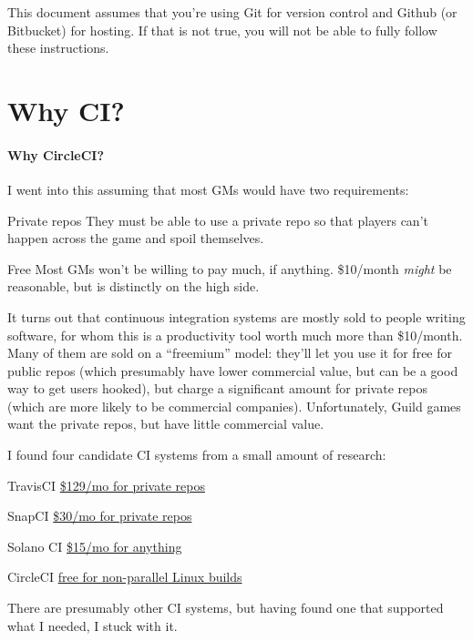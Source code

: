 \documentclass[green]{testgame}
\begin{document}
\newcommand{\ter}[1]{\fbox{\parbox{6.5in}{{\tt #1}}}}


This document assumes that you're using Git for version control and Github (or Bitbucket) for hosting. If that is not true, you will not be able to fully follow these instructions.

\section{Why CI?}

\begin{WrapText}
  \paragraph*{Why CircleCI?} I went into this assuming that most GMs would have two requirements:
  \begin{desc}
  \item[Private repos] They must be able to use a private repo so that players can't happen across the game and spoil themselves.
  \item[Free] Most GMs won't be willing to pay much, if anything. \$10/month \emph{might} be reasonable, but is distinctly on the high side.
  \end{desc}

  It turns out that continuous integration systems are mostly sold to people writing software, for whom this is a productivity tool worth much more than \$10/month. Many of them are sold on a ``freemium'' model: they'll let you use it for free for public repos (which presumably have lower commercial value, but can be a good way to get users hooked), but charge a significant amount for private repos (which are more likely to be commercial companies). Unfortunately, Guild games want the private repos, but have little commercial value.

  I found four candidate CI systems from a small amount of research:
  \begin{desc}
  \item[TravisCI] \href{https://travis-ci.com/plans}{\$129/mo for private repos}
  \item[SnapCI] \href{https://snap-ci.com/my_plans/}{\$30/mo for private repos}
  \item[Solano CI] \href{https://www.solanolabs.com/#pricing}{\$15/mo for anything}
  \item[CircleCI] \href{https://circleci.com/pricing/}{free for non-parallel Linux builds}
  \end{desc}


  There are presumably other CI systems, but having found one that supported what I needed, I stuck with it.
\end{WrapText}
\end{document}
